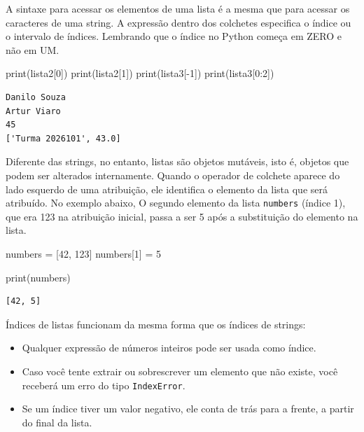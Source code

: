 \documentclass[
  brazilian,
  letterpaper,
  DIV=11,
  numbers=noendperiod]{scrreprt}
\newenvironment{Shaded}{\begin{snugshade}}{\end{snugshade}}
\newcommand{\BuiltInTok}[1]{\textcolor[rgb]{0.00,0.23,0.31}{#1}}
\newcommand{\DecValTok}[1]{\textcolor[rgb]{0.68,0.00,0.00}{#1}}
\newcommand{\NormalTok}[1]{\textcolor[rgb]{0.00,0.23,0.31}{#1}}
\newcommand{\OperatorTok}[1]{\textcolor[rgb]{0.37,0.37,0.37}{#1}}
\begin{document}
A sintaxe para acessar os elementos de uma lista é a mesma que para
acessar os caracteres de uma string. A expressão dentro dos colchetes
especifica o índice ou o intervalo de índices. Lembrando que o índice no
Python começa em ZERO e não em UM.

\begin{Shaded}
\begin{Highlighting}[]
\BuiltInTok{print}\NormalTok{(lista2[}\DecValTok{0}\NormalTok{])}
\BuiltInTok{print}\NormalTok{(lista2[}\DecValTok{1}\NormalTok{])}
\BuiltInTok{print}\NormalTok{(lista3[}\OperatorTok{{-}}\DecValTok{1}\NormalTok{])}
\BuiltInTok{print}\NormalTok{(lista3[}\DecValTok{0}\NormalTok{:}\DecValTok{2}\NormalTok{])}
\end{Highlighting}
\end{Shaded}

\begin{verbatim}
Danilo Souza
Artur Viaro
45
['Turma 2026101', 43.0]
\end{verbatim}

Diferente das strings, no entanto, listas são objetos mutáveis, isto é,
objetos que podem ser alterados internamente. Quando o operador de
colchete aparece do lado esquerdo de uma atribuição, ele identifica o
elemento da lista que será atribuído. No exemplo abaixo, O segundo
elemento da lista \texttt{numbers} (índice 1), que era 123 na atribuição
inicial, passa a ser 5 após a substituição do elemento na lista.

\begin{Shaded}
\begin{Highlighting}[]
\NormalTok{numbers }\OperatorTok{=}\NormalTok{ [}\DecValTok{42}\NormalTok{, }\DecValTok{123}\NormalTok{]}
\NormalTok{numbers[}\DecValTok{1}\NormalTok{] }\OperatorTok{=} \DecValTok{5}

\BuiltInTok{print}\NormalTok{(numbers)}
\end{Highlighting}
\end{Shaded}

\begin{verbatim}
[42, 5]
\end{verbatim}

Índices de listas funcionam da mesma forma que os índices de strings:

\begin{itemize}
\item
  Qualquer expressão de números inteiros pode ser usada como índice.
\item
  Caso você tente extrair ou sobrescrever um elemento que não existe,
  você receberá um erro do tipo \texttt{IndexError}.
\item
  Se um índice tiver um valor negativo, ele conta de trás para a frente,
  a partir do final da lista.
\end{itemize}
\end{document}
